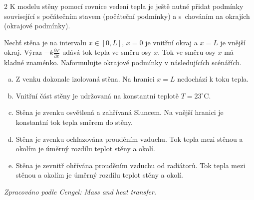 \begin{multicols}2
  K modelu stěny pomocí rovnice vedení tepla je ještě nutné přidat podmínky související s počátečním stavem (počáteční podmínky) a s~chováním na okrajích (okrajové podmínky).

  Nechť stěna je na intervalu $x\in[0,L]$, $x=0$ je vnitřní okraj a $x=L$ je vnější okraj. Výraz $-k\frac{\partial T}{\partial x}$ udává tok tepla ve směru osy $x$. Tok ve směru osy $x$ má kladné znaménko. Naformulujte okrajové podmínky v následujících scénářích.
\begin{enumerate}[a)] pt
\item Z venku dokonale izolovaná stěna. Na hranici $x=L$ nedochází k toku tepla.
\item Vnitřní část stěny je udržovaná na konstantní teplotě $T=23^\circ \mathrm C$.
\item Stěna je zvenku osvětlená a zahřívaná Sluncem. Na vnější hranici je konstantní tok tepla směrem do stěny.
\item Stěna je zvenku ochlazována prouděním vzduchu. Tok tepla mezi stěnou a okolím je úměrný rozdílu teplot stěny a okolí.
\item Stěna je zevnitř ohřívána prouděním vzduchu od radiátorů. Tok tepla mezi stěnou a okolím je úměrný rozdílu teplot stěny a okolí.
\end{enumerate}
\textit{Zpracováno podle Cengel: Mass and heat transfer.} 
\end{multicols}

\reseni

